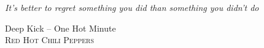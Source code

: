 
\setlength\epigraphrule{1.5pt}
\setlength{\epigraphwidth}{0.55\textwidth}
\thispagestyle{empty}
\vspace*{100pt}

\epigraph{\textit{\Large It's better to regret something you did than something you didn't do}}%
{Deep Kick -- One Hot Minute\\ \textsc{Red Hot Chili Peppers}}
